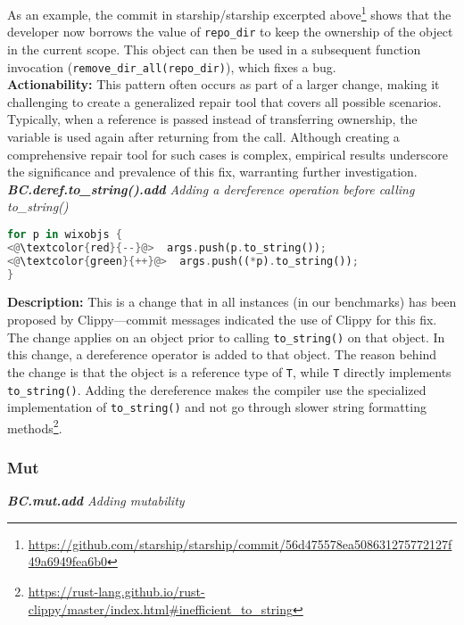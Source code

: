 As an example, the commit in starship/starship excerpted above\footnote{\scriptsize \url{https://github.com/starship/starship/commit/56d475578ea508631275772127f49a6949fea6b0}} shows that the developer now borrows the value of \verb+repo_dir+ to keep the ownership of the object in the current scope. This object can then be used in a subsequent function invocation (\verb+remove_dir_all(repo_dir)+), which fixes a bug. \\

\noindent\textbf{Actionability:} This pattern often occurs as part of a larger change, making it challenging to create a generalized repair tool that covers all possible scenarios. Typically, when a reference is passed instead of transferring ownership, the variable is used again after returning from the call. Although creating a comprehensive repair tool for such cases is complex, empirical results underscore the significance and prevalence of this fix, warranting further investigation. \\

\noindent\textit{\textbf{BC.deref.to\_string().add} Adding a dereference operation before calling to\_string()}

\begin{lstlisting}[language=Rust, style=colouredRust]
for p in wixobjs {
<@\textcolor{red}{--}@>  args.push(p.to_string());
<@\textcolor{green}{++}@>  args.push((*p).to_string());
}

\end{lstlisting}

\noindent\textbf{Description:} This is a change that in all instances (in our benchmarks) has been proposed by Clippy---commit messages indicated the use of Clippy for this fix. The change applies on an object prior to calling \verb+to_string()+ on that object. In this change, a dereference operator is added to that object. The reason behind the change is that the object is a reference type of \verb+T+, while \verb+T+ directly implements \verb+to_string()+. Adding the dereference makes the compiler use the specialized implementation of \verb+to_string()+ and not go through slower string formatting methods\footnote{\url{https://rust-lang.github.io/rust-clippy/master/index.html\#inefficient\_to\_string}}.


\subsubsection{Mut}

\noindent\textit{\textbf{BC.mut.add} Adding mutability}

